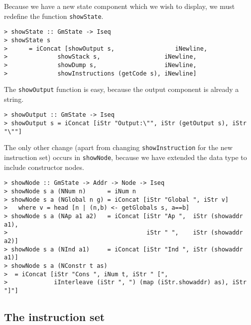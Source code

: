 Because we have a new state component which we wish to display, we
must redefine the function \mbox{\tt showState}.
\begin{verbatim}
> showState :: GmState -> Iseq
> showState s
>      = iConcat [showOutput s,                 iNewline,
>              showStack s,                  iNewline,
>              showDump s,                   iNewline,
>              showInstructions (getCode s), iNewline]
\end{verbatim}
%
%
The \mbox{\tt showOutput} function is easy, because the output component is already a
string.
\begin{verbatim}
> showOutput :: GmState -> Iseq
> showOutput s = iConcat [iStr "Output:\"", iStr (getOutput s), iStr "\""]
\end{verbatim}
%
%
\par
The only other change (apart from changing \mbox{\tt showInstruction} for the new
instruction set) occurs in \mbox{\tt showNode}, because we have extended the data type
to include constructor nodes.
\begin{verbatim}
> showNode :: GmState -> Addr -> Node -> Iseq
> showNode s a (NNum n)      = iNum n
> showNode s a (NGlobal n g) = iConcat [iStr "Global ", iStr v]
>   where v = head [n | (n,b) <- getGlobals s, a==b]
> showNode s a (NAp a1 a2)   = iConcat [iStr "Ap ",  iStr (showaddr a1),
>                                       iStr " ",    iStr (showaddr a2)]
> showNode s a (NInd a1)     = iConcat [iStr "Ind ", iStr (showaddr a1)]
> showNode s a (NConstr t as)
>  = iConcat [iStr "Cons ", iNum t, iStr " [",
>             iInterleave (iStr ", ") (map (iStr.showaddr) as), iStr "]"]
\end{verbatim}
%
%
%
%
%
%
\subsection{The instruction set}

